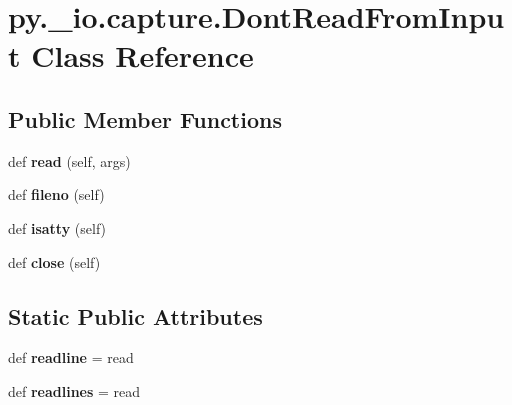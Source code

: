 \hypertarget{classpy_1_1__io_1_1capture_1_1_dont_read_from_input}{}\section{py.\+\_\+io.\+capture.\+Dont\+Read\+From\+Input Class Reference}
\label{classpy_1_1__io_1_1capture_1_1_dont_read_from_input}
\subsection*{Public Member Functions}
\begin{DoxyCompactItemize}
\item 
\mbox{\label{classpy_1_1__io_1_1capture_1_1_dont_read_from_input_a9ae1e47518966d5cbd21a1fd086be8e7}} 
def {\bfseries read} (self, args)
\item 
\mbox{\label{classpy_1_1__io_1_1capture_1_1_dont_read_from_input_affac811a2f47c5b56ec541d44105970a}} 
def {\bfseries fileno} (self)
\item 
\mbox{\label{classpy_1_1__io_1_1capture_1_1_dont_read_from_input_a7954b3966e757347f1c074e416b5031a}} 
def {\bfseries isatty} (self)
\item 
\mbox{\label{classpy_1_1__io_1_1capture_1_1_dont_read_from_input_a06265d8157115905de764e6970b014a2}} 
def {\bfseries close} (self)
\end{DoxyCompactItemize}
\subsection*{Static Public Attributes}
\begin{DoxyCompactItemize}
\item 
\mbox{\label{classpy_1_1__io_1_1capture_1_1_dont_read_from_input_aa5a0a7e81d256337dc2c346bdfbb2ae5}} 
def {\bfseries readline} = read
\item 
\mbox{\label{classpy_1_1__io_1_1capture_1_1_dont_read_from_input_a27355cc94cea6fb2b4d079096157a7c2}} 
def {\bfseries readlines} = read
\end{DoxyCompactItemize}


